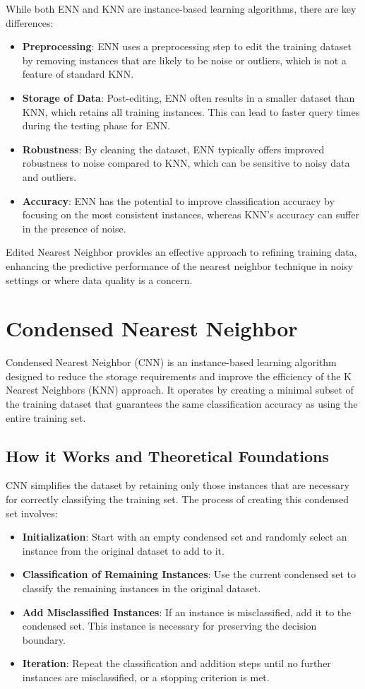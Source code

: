 \documentclass[12pt]{article}
\begin{document}
While both ENN and KNN are instance-based learning algorithms, there are key differences:
\begin{itemize}
    \item \textbf{Preprocessing}: ENN uses a preprocessing step to edit the training dataset by removing instances that are likely to be noise or outliers, which is not a feature of standard KNN.
    \item \textbf{Storage of Data}: Post-editing, ENN often results in a smaller dataset than KNN, which retains all training instances. This can lead to faster query times during the testing phase for ENN.
    \item \textbf{Robustness}: By cleaning the dataset, ENN typically offers improved robustness to noise compared to KNN, which can be sensitive to noisy data and outliers.
    \item \textbf{Accuracy}: ENN has the potential to improve classification accuracy by focusing on the most consistent instances, whereas KNN's accuracy can suffer in the presence of noise.
\end{itemize}

Edited Nearest Neighbor provides an effective approach to refining training data, enhancing the predictive performance of the nearest neighbor technique in noisy settings or where data quality is a concern.
\section{Condensed Nearest Neighbor}

Condensed Nearest Neighbor (CNN) is an instance-based learning algorithm designed to reduce the storage requirements and improve the efficiency of the K Nearest Neighbors (KNN) approach. It operates by creating a minimal subset of the training dataset that guarantees the same classification accuracy as using the entire training set.

\subsection{How it Works and Theoretical Foundations}

CNN simplifies the dataset by retaining only those instances that are necessary for correctly classifying the training set. The process of creating this condensed set involves:

\begin{itemize}
    \item \textbf{Initialization}: Start with an empty condensed set and randomly select an instance from the original dataset to add to it.
    \item \textbf{Classification of Remaining Instances}: Use the current condensed set to classify the remaining instances in the original dataset.
    \item \textbf{Add Misclassified Instances}: If an instance is misclassified, add it to the condensed set. This instance is necessary for preserving the decision boundary.
    \item \textbf{Iteration}: Repeat the classification and addition steps until no further instances are misclassified, or a stopping criterion is met.
\end{itemize}
\end{document}
